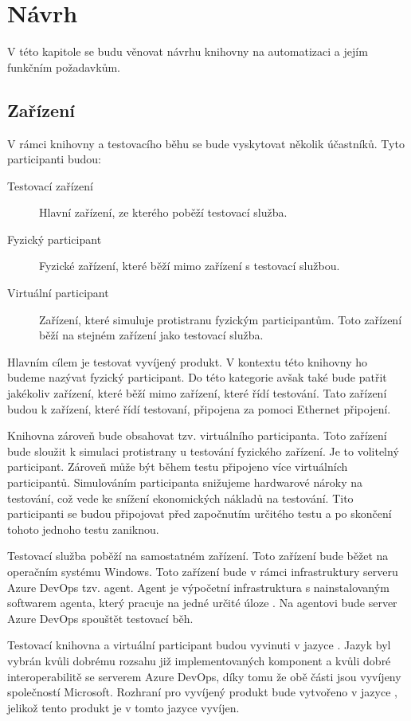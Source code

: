 \chapter{Návrh}

V této kapitole se budu věnovat návrhu knihovny na automatizaci a jejím funkčním požadavkům.

\section{Zařízení}
V rámci knihovny a testovacího běhu se bude vyskytovat několik účastníků. Tyto participanti budou:

\begin{description}
    \item[Testovací zařízení] Hlavní zařízení, ze kterého poběží testovací služba.
    \item[Fyzický participant] Fyzické zařízení, které běží mimo zařízení s testovací službou. 
    \item[Virtuální participant] Zařízení, které simuluje protistranu fyzickým participantům. Toto zařízení běží na stejném zařízení jako testovací služba.
\end{description}

Hlavním cílem je testovat vyvíjený produkt. V kontextu této knihovny ho budeme nazývat fyzický participant. Do této kategorie avšak také bude patřit jakékoliv zařízení, které běží mimo zařízení, které řídí testování. Tato zařízení budou k zařízení, které řídí testovaní, připojena za pomoci Ethernet připojení.

Knihovna zároveň bude obsahovat tzv. virtuálního participanta. Toto zařízení bude sloužit k simulaci protistrany u testování fyzického zařízení. Je to volitelný participant. Zároveň může být během testu připojeno více virtuálních participantů. Simulováním participanta snižujeme hardwarové nároky na testování, což vede ke snížení ekonomických nákladů na testování. Tito participanti se budou připojovat před započnutím určitého testu a po skončení tohoto jednoho testu zaniknou.

Testovací služba poběží na samostatném zařízení. Toto zařízení bude běžet na operačním systému Windows. Toto zařízení bude v rámci infrastruktury serveru Azure DevOps tzv. agent. Agent je výpočetní infrastruktura s nainstalovaným softwarem agenta, který pracuje na jedné určité úloze \cite{agent_docs}. Na agentovi bude server Azure DevOps spouštět testovací běh.

Testovací knihovna a virtuální participant budou vyvinuti v jazyce . Jazyk byl vybrán kvůli dobrému rozsahu již implementovaných komponent a kvůli dobré interoperabilitě se serverem Azure DevOps, díky tomu že obě části jsou vyvíjeny společností Microsoft. Rozhraní pro vyvíjený produkt bude vytvořeno v jazyce , jelikož tento produkt je v tomto jazyce vyvíjen.


